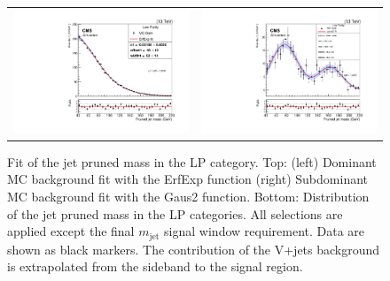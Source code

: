 \begin{figure}[!ht]
\begin{center}
\end{center}
\label{fig:fitprunedHP}
\end{figure}

\begin{figure}[!ht]
\caption{ Fit of the jet pruned mass in the LP category. Top: (left) Dominant MC background fit with the ErfExp function (right) Subdominant MC background fit with the Gaus2 function. Bottom: Distribution of the jet pruned mass in the LP categories. All selections are applied except the final $m_{\text{jet}}$ signal window requirement. Data are shown as black markers. The contribution of the V+jets background is extrapolated from the sideband to the signal region.}
\begin{tabular}{cc}
  \includegraphics[width=250pt]{figuresARC/Vjets/DomLP.pdf} &
\includegraphics[width=250pt]{figuresARC/Vjets/SubDomLP.pdf}\\
\end{tabular}
\begin{center}

\end{center}
\end{figure}
